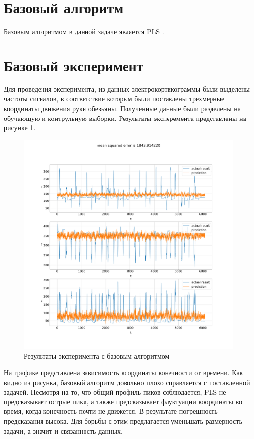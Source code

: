 \section{Базовый алгоритм}
Базовым алгоритмом в данной задаче является PLS \cite{Haenlein2004}.

\section{Базовый эксперимент}
Для проведения эксперимента, из данных электрокортикограммы были выделены частоты сигналов, в соответствие которым были поставлены трехмерные координаты движения руки обезьяны. Полученные данные были разделены на обучающую и контрульную выборки. Результаты эксперемента представлены на рисунке \ref{fig:baseAlgo}.
\begin{figure}
  \begin{center}
    \includegraphics[width=\textwidth]{pls.pdf}
    \caption{Результаты эксперимента с базовым алгоритмом}
    \label{fig:baseAlgo}
  \end{center}
\end{figure}
На графике представлена зависимость координаты конечности от времени. Как видно из рисунка, базовый алгоритм довольно плохо справляется с поставленной задачей. Несмотря на то, что общий профиль пиков соблюдается, PLS не предсказывает острые пики, а также предсказывает флуктуации координаты во время, когда конечность почти не движется. В результате погрешность предсказания высока. Для борьбы с этим предлагается уменьшать размерность задачи, а значит и связанность данных.
